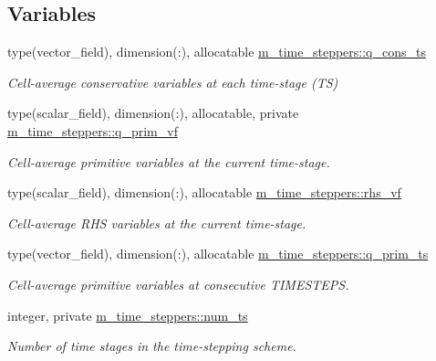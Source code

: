 \subsection*{Variables}
\begin{DoxyCompactItemize}
\item 
type(vector\+\_\+field), dimension(\+:), allocatable \hyperlink{namespacem__time__steppers_a4bbe3aedc07e11e85679ec0c7a094f37}{m\+\_\+time\+\_\+steppers\+::q\+\_\+cons\+\_\+ts}
\begin{DoxyCompactList}\small\item\em Cell-\/average conservative variables at each time-\/stage (TS) \end{DoxyCompactList}\item 
type(scalar\+\_\+field), dimension(\+:), allocatable, private \hyperlink{namespacem__time__steppers_a10a568906592e51b56cf5dbfba0d9edb}{m\+\_\+time\+\_\+steppers\+::q\+\_\+prim\+\_\+vf}
\begin{DoxyCompactList}\small\item\em Cell-\/average primitive variables at the current time-\/stage. \end{DoxyCompactList}\item 
type(scalar\+\_\+field), dimension(\+:), allocatable \hyperlink{namespacem__time__steppers_a3d0867c3c2572c712d2aed6d677e6fc2}{m\+\_\+time\+\_\+steppers\+::rhs\+\_\+vf}
\begin{DoxyCompactList}\small\item\em Cell-\/average R\+HS variables at the current time-\/stage. \end{DoxyCompactList}\item 
type(vector\+\_\+field), dimension(\+:), allocatable \hyperlink{namespacem__time__steppers_a5fbb5dbdd477579d17f067ec7900e659}{m\+\_\+time\+\_\+steppers\+::q\+\_\+prim\+\_\+ts}
\begin{DoxyCompactList}\small\item\em Cell-\/average primitive variables at consecutive T\+I\+M\+E\+S\+T\+E\+PS. \end{DoxyCompactList}\item 
integer, private \hyperlink{namespacem__time__steppers_af1bbf3b693b9d269249a93dca5069b56}{m\+\_\+time\+\_\+steppers\+::num\+\_\+ts}
\begin{DoxyCompactList}\small\item\em Number of time stages in the time-\/stepping scheme. \end{DoxyCompactList}\end{DoxyCompactItemize}


